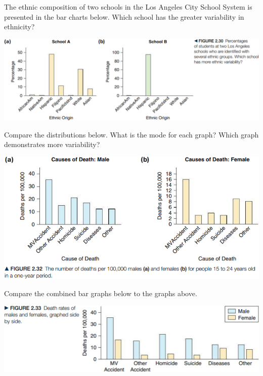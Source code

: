 \documentclass[../mathNotesPreamble]{subfiles}
\begin{document}
  \begin{ex*}
    The ethnic composition of two schools in the Los Angeles City School System is presented in the bar charts below. Which school has the greater variability in ethnicity?
  \end{ex*}
  \begin{center}
    \includegraphics[width=0.975\linewidth]{images/math211_figure_2p30}
  \end{center}
  \pagebreak

  \begin{ex*}
    Compare the distributions below. What is the mode for each graph? Which graph demonstrates more variability?
  \end{ex*}
  \begin{center}
    \includegraphics[width=0.975\linewidth]{images/math211_figure_2p32}
  \end{center}
  \begin{ex*}
    Compare the combined bar graphs below to the graphs above.
  \end{ex*}
  \begin{center}
    \includegraphics[width=0.9\linewidth]{images/math211_figure_2p33}
  \end{center}

  \pagebreak
\end{document}
